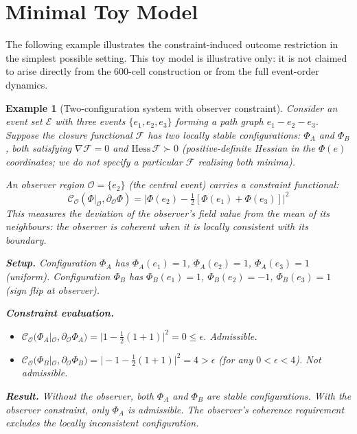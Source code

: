 \documentclass[12pt]{article}
\newtheorem{example}[theorem]{Example}
\newcommand{\Ecal}{\mathcal{E}}
\newcommand{\Fcal}{\mathcal{F}}
\newcommand{\Ocal}{\mathcal{O}}
\newcommand{\Ccal}{\mathcal{C}}
\begin{document}
\section{Minimal Toy Model}\label{sec:toy}

The following example illustrates the constraint-induced outcome restriction in the simplest possible setting. This toy model is illustrative only: it is not claimed to arise directly from the 600-cell construction or from the full event-order dynamics.

\begin{example}[Two-configuration system with observer constraint]\label{ex:toy}
Consider an event set $\Ecal$ with three events $\{e_1, e_2, e_3\}$ forming a path graph $e_1 - e_2 - e_3$. Suppose the closure functional $\Fcal$ has two locally stable configurations: $\Phi_A$ and $\Phi_B$, both satisfying $\nabla \Fcal = 0$ and $\mathrm{Hess}\, \Fcal \succ 0$ (positive-definite Hessian in the $\Phi(e)$ coordinates; we do not specify a particular $\Fcal$ realising both minima).

An observer region $\Ocal = \{e_2\}$ (the central event) carries a constraint functional:
\begin{equation}
    \Ccal_\Ocal(\Phi|_\Ocal, \partial_\Ocal \Phi) = \bigl|\Phi(e_2) - \tfrac{1}{2}[\Phi(e_1) + \Phi(e_3)]\bigr|^2
\end{equation}
This measures the deviation of the observer's field value from the mean of its neighbours: the observer is coherent when it is locally consistent with its boundary.

\textbf{Setup.} Configuration $\Phi_A$ has $\Phi_A(e_1) = 1$, $\Phi_A(e_2) = 1$, $\Phi_A(e_3) = 1$ (uniform). Configuration $\Phi_B$ has $\Phi_B(e_1) = 1$, $\Phi_B(e_2) = -1$, $\Phi_B(e_3) = 1$ (sign flip at observer).

\textbf{Constraint evaluation.}
\begin{itemize}
    \item $\Ccal_\Ocal\!\bigl(\Phi_A|_\Ocal, \partial_\Ocal \Phi_A\bigr) = |1 - \tfrac{1}{2}(1+1)|^2 = 0 \leq \epsilon$. \quad Admissible.
    \item $\Ccal_\Ocal\!\bigl(\Phi_B|_\Ocal, \partial_\Ocal \Phi_B\bigr) = |-1 - \tfrac{1}{2}(1+1)|^2 = 4 > \epsilon$ \quad (for any $0 < \epsilon < 4$). \quad Not admissible.
\end{itemize}

\textbf{Result.} Without the observer, both $\Phi_A$ and $\Phi_B$ are stable configurations. With the observer constraint, only $\Phi_A$ is admissible. The observer's coherence requirement excludes the locally inconsistent configuration.


\end{example}
\end{document}
